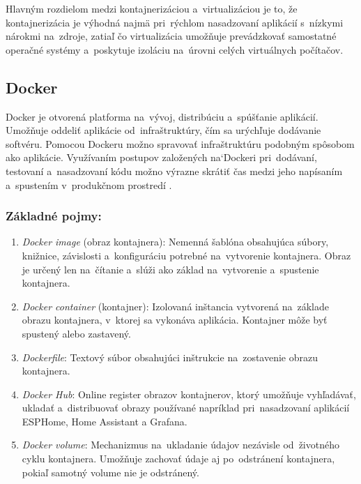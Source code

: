 Hlavným rozdielom medzi kontajnerizáciou a~virtualizáciou je to, že kontajnerizácia 
je výhodná najmä pri~rýchlom nasadzovaní aplikácií s~nízkymi nárokmi na~zdroje, 
zatiaľ čo virtualizácia umožňuje prevádzkovať samostatné operačné systémy 
a~poskytuje izoláciu na~úrovni celých virtuálnych počítačov.

\subsection{Docker}
Docker je otvorená platforma na~vývoj, distribúciu a~spúšťanie aplikácií. 
Umožňuje oddeliť aplikácie od~infraštruktúry, čím sa urýchľuje dodávanie softvéru. 
Pomocou Dockeru možno spravovať infraštruktúru podobným spôsobom ako aplikácie. 
Využívaním postupov založených na`Dockeri pri~dodávaní, testovaní a~nasadzovaní 
kódu možno výrazne skrátiť čas medzi jeho napísaním a~spustením v~produkčnom 
prostredí \cite{docker}.

\subsubsection*{Základné pojmy:}
\begin{enumerate}
  \item \emph{Docker image} (obraz kontajnera): Nemenná šablóna obsahujúca súbory, 
  knižnice, závislosti a~konfiguráciu potrebné na~vytvorenie kontajnera. 
  Obraz je určený len na~čítanie a~slúži ako základ na~vytvorenie a~spustenie 
  kontajnera.

  \item \emph{Docker container} (kontajner): Izolovaná inštancia vytvorená na~základe 
  obrazu kontajnera, v~ktorej sa vykonáva aplikácia. Kontajner môže byť spustený 
  alebo zastavený.

  \item \emph{Dockerfile}: Textový súbor obsahujúci inštrukcie na~zostavenie obrazu 
  kontajnera.

  \item \emph{Docker Hub}: Online register obrazov kontajnerov, ktorý umožňuje vyhľadávať, 
  ukladať a~distribuovať obrazy používané napríklad pri~nasadzovaní aplikácií 
  ESPHome, Home Assistant a Grafana.

  \item \emph{Docker volume}: Mechanizmus na~ukladanie údajov nezávisle od~životného 
  cyklu kontajnera. Umožňuje zachovať údaje aj po~odstránení kontajnera, 
  pokiaľ samotný volume nie je odstránený.
\end{enumerate}

